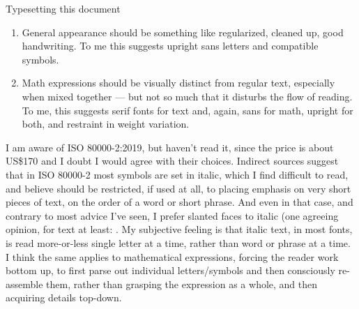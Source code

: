 \begin{plSection}{Typesetting this document}
\begin{enumerate}
\item General appearance should be something like regularized,
    cleaned up, good handwriting. To me this suggests upright
    sans letters and compatible symbols.

\item Math expressions should be visually distinct from regular
    text, especially when mixed together --- but not so much
    that it disturbs the flow of reading. To me, this suggests
    serif fonts for text and, again, sans for math, upright
    for both, and restraint in weight variation.
\end{enumerate}

I am aware of ISO 80000-2:2019, but haven't read it,
since the price is about US\$170 and I doubt I would agree with
their choices. Indirect sources suggest that in ISO 80000-2
most symbols are set in italic, which I find difficult to read,
and believe should be restricted, if used at all, to placing
emphasis on very short pieces of text, on the order of a word
or short phrase.
And even in that case, and contrary to most
advice I've seen, I prefer slanted faces to italic
(one agreeing opinion, for text at least: 
.
My subjective feeling is that italic text,
in most fonts, is read more-or-less single letter at a time,
rather than word or phrase at a time. I think the same applies
to mathematical expressions, forcing the reader work bottom up,
to first parse out individual letters/symbols and then
consciously re-assemble them, rather than grasping
the expression as a whole, and then acquiring details top-down.


\vfill

\end{plSection}%
